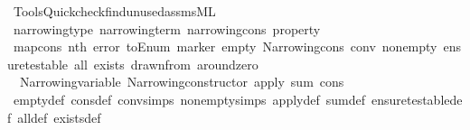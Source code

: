 \begin{isabellebody}
{}
\isamarkuptrue%
%
\endisatagdocument
{\isafolddocument}%
%
\isadelimdocument
%
\endisadelimdocument
%
\isadelimML
%
\endisadelimML
%
\isatagML
{}\isamarkupfalse%
\ {\isacartoucheopen}Tools{\isacharslash}{\kern0pt}Quickcheck{\isacharslash}{\kern0pt}find{\isacharunderscore}{\kern0pt}unused{\isacharunderscore}{\kern0pt}assms{\isachardot}{\kern0pt}ML{\isacartoucheclose}%
\endisatagML
{\isafoldML}%
%
\isadelimML
%
\endisadelimML
%
\isadelimdocument
%
\endisadelimdocument
%
\isatagdocument
%
\isamarkuptrue%
%
\endisatagdocument
{\isafolddocument}%
%
\isadelimdocument
%
\endisadelimdocument
{}\isamarkupfalse%
\ narrowing{\isacharunderscore}{\kern0pt}type\ narrowing{\isacharunderscore}{\kern0pt}term\ narrowing{\isacharunderscore}{\kern0pt}cons\ property\isanewline
{}\isamarkupfalse%
\ map{\isacharunderscore}{\kern0pt}cons\ nth\ error\ toEnum\ marker\ empty\ Narrowing{\isacharunderscore}{\kern0pt}cons\ conv\ non{\isacharunderscore}{\kern0pt}empty\ ensure{\isacharunderscore}{\kern0pt}testable\ all\ exists\ drawn{\isacharunderscore}{\kern0pt}from\ around{\isacharunderscore}{\kern0pt}zero\isanewline
{}\isamarkupfalse%
\ {\isacharparenleft}{\kern0pt}\ Narrowing{\isacharunderscore}{\kern0pt}variable\ Narrowing{\isacharunderscore}{\kern0pt}constructor\ {\isachardoublequoteopen}apply{\isachardoublequoteclose}\ sum\ cons\isanewline
{}\isamarkupfalse%
\ empty{\isacharunderscore}{\kern0pt}def\ cons{\isacharunderscore}{\kern0pt}def\ conv{\isachardot}{\kern0pt}simps\ non{\isacharunderscore}{\kern0pt}empty{\isachardot}{\kern0pt}simps\ apply{\isacharunderscore}{\kern0pt}def\ sum{\isacharunderscore}{\kern0pt}def\ ensure{\isacharunderscore}{\kern0pt}testable{\isacharunderscore}{\kern0pt}def\ all{\isacharunderscore}{\kern0pt}def\ exists{\isacharunderscore}{\kern0pt}def\isanewline
%
\isadelimtheory
\isanewline
%
\endisadelimtheory
%
\isatagtheory
{}\isamarkupfalse%
%
\endisatagtheory
{\isafoldtheory}%
%
\isadelimtheory
%
\endisadelimtheory
%
\end{isabellebody}%
\endinput
